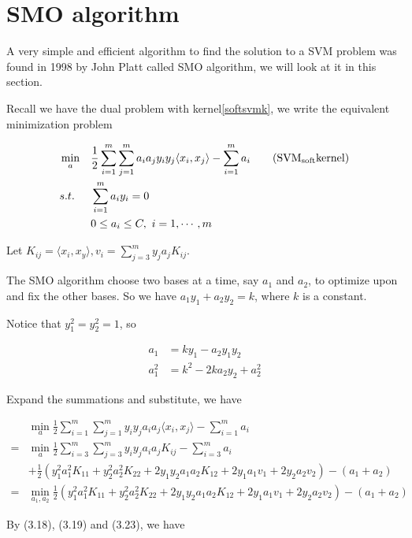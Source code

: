 \documentclass[a4paper]{report}
\begin{document}
\section{SMO algorithm}

A very simple and efficient algorithm to find the solution to a SVM problem was found in 1998 by John Platt called SMO algorithm\cite{platt1998sequential}, we will look at it in this section.

Recall we have the dual problem with kernel\ref{softsvmk}, we write the equivalent minimization problem

\begin{align*}
    &\min_a & & \frac{1}{2} \sum_{i=1}^m\sum_{j=1}^m a_i a_j y_i y_j \langle x_i, x_j\rangle - \sum_{i=1}^m a_i  \label{softsvmm}\tag{$\mathrm{SVM_{soft} kernel}$}\\
    &s.t. \ & & \sum_{i=1}^m a_i y_i=0 \\
    & & & 0\leq a_i \leq C,\ i=1,\cdots,m 
\end{align*}

Let $K_{ij}=\langle x_i,x_y\rangle, v_i=\sum_{j=3}^m y_j a_j K_{ij}$.

The SMO algorithm choose two bases at a time, say $a_1$ and $a_2$, to optimize upon and fix the other bases. So we have $a_1 y_1 + a_2 y_2=k$, where $k$ is a constant. 

Notice that $y_1^2=y_2^2=1$, so 

\begin{align}
    a_1&=ky_1-a_2y_1y_2\\
    a_1^2&=k^2-2ka_2y_2 + a_2^2
\end{align}

Expand the summations and substitute, we have

\begin{align}
    &\min_a \frac{1}{2}\sum_{i=1}^m\sum_{j=1}^m y_iy_ja_ia_j\langle x_i,x_j\rangle - \sum_{i=1}^m a_i \\
    =&\min_a \frac{1}{2}\sum_{i=3}^m\sum_{j=3}^m y_i y_j a_i a_j K_{ij} - \sum_{i=3}^m a_i \\
     &+\frac{1}{2}(y_1^2 a_1^2 K_{11}+y_2^2 a_2^2 K_{22} + 2y_1y_2 a_1a_2 K_{12} 
     +2y_1a_1v_1 + 2y_2a_2v_2) - (a_1+a_2) \\
    =&\min_{a_1,a_2} \frac{1}{2}(y_1^2 a_1^2 K_{11}+y_2^2 a_2^2 K_{22} + 2y_1y_2 a_1a_2 K_{12} 
     +2y_1a_1v_1 + 2y_2a_2v_2) - (a_1+a_2) 
\end{align}

By (3.18), (3.19) and (3.23), we have 
\end{document}
